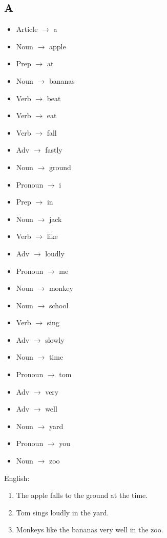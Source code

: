 \documentclass[paper=a4, fontsize=11pt]{scrartcl} %
\begin{document}
\subsection{A}

\begin{itemize}
\item Article $\rightarrow$ a
\item Noun $\rightarrow$ apple
\item Prep $\rightarrow$ at
\item Noun $\rightarrow$ bananas
\item Verb $\rightarrow$ beat
\item Verb $\rightarrow$ eat
\item Verb $\rightarrow$ fall
\item Adv $\rightarrow$ fastly
\item Noun $\rightarrow$ ground
\item Pronoun $\rightarrow$ i
\item Prep $\rightarrow$ in
\item Noun $\rightarrow$ jack
\item Verb $\rightarrow$ like
\item Adv $\rightarrow$ loudly
\item Pronoun $\rightarrow$ me
\item Noun $\rightarrow$ monkey
\item Noun $\rightarrow$ school
\item Verb $\rightarrow$ sing
\item Adv $\rightarrow$ slowly
\item Noun $\rightarrow$ time
\item Pronoun $\rightarrow$ tom
\item Adv $\rightarrow$ very
\item Adv $\rightarrow$ well
\item Noun $\rightarrow$ yard
\item Pronoun $\rightarrow$ you
\item Noun $\rightarrow$ zoo
\end{itemize}

English:
\begin{enumerate}
\item The apple falls to the ground at the time.
\item Tom sings loudly in the yard.
\item Monkeys like the bananas very well in the zoo.
\end{enumerate}
\end{document}

